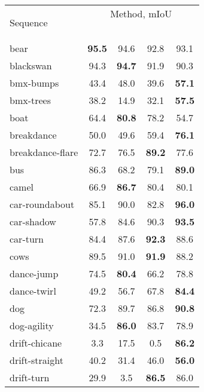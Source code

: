 \documentclass[10pt,twocolumn,letterpaper]{article}
\begin{document}
\begin{table}
\begin{centering}
\begingroup
\begin{tabular}{l|@{   }c@{   }c@{   }c@{   }c@{    }}
\multirow{2}{*}{Sequence} & \multicolumn{4}{c}{Method, mIoU}\\
&  \cite{Maerki2016Cvpr} & \ \cite{Tsai2016Cvpr} & \  & \   \tabularnewline
\hline
\hline
bear                & \bf 95.5    &     94.6    &     92.8  &		93.1 \\
blackswan           &     94.3    & \bf 94.7    &     91.9  &		90.3 \\
bmx-bumps           &     43.4    &     48.0    &     39.6  & \bf 57.1 \\
bmx-trees           & 38.2    &     14.9    &     32.1  &	\bf 	57.5 \\
boat                &     64.4    & \bf 80.8    &     78.2  &		54.7 \\
breakdance          &     50.0    &     49.6    &  59.4  &	\bf 	76.1 \\
breakdance-flare    &     72.7    &     76.5    & \bf 89.2  &		77.6 \\
bus                 &  86.3    &     68.2    &     79.1  &	\bf 	89.0 \\
camel               &     66.9    & \bf 86.7    &     80.4  &		80.1 \\
car-roundabout      &     85.1    &  90.0    &     82.8  &	\bf 	96.0 \\
car-shadow          &     57.8    &     84.6    &  90.3  &	\bf 	93.5 \\
car-turn            &     84.4    &     87.6    & \bf 92.3  &		88.6 \\
cows                &     89.5    &     91.0    & \bf 91.9  &		88.2 \\
dance-jump          &     74.5    & \bf 80.4    &     66.2  &		78.8 \\
dance-twirl         &     49.2    &     56.7    &  67.8  &	\bf 	84.4 \\
dog                 &     72.3    & 89.7    &     86.8  &	\bf 	90.8 \\
dog-agility         &     34.5    & \bf 86.0    &     83.7  &		78.9 \\
drift-chicane       &     3.3     &  17.5    &     0.5   &	\bf 	86.2 \\
drift-straight      &     40.2    &     31.4    &  46.0  &	\bf 	56.0 \\
drift-turn          &     29.9    &     3.5     & \bf 86.5  &		86.0 \\

\end{tabular}
\end{centering}
\end{table}
\end{document}
